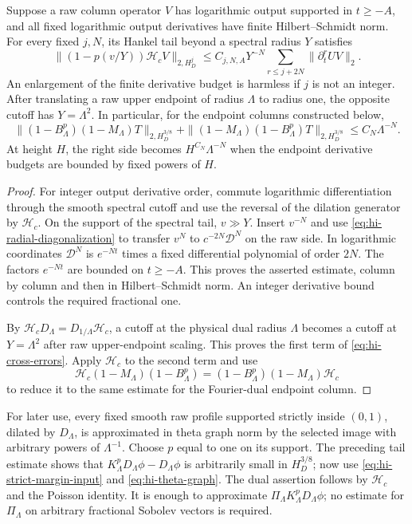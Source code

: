 \begin{lemma}\label{lem:hi-hankel-cross}
Suppose a raw column operator $V$ has logarithmic output supported in
$t\ge-A$, and all fixed logarithmic output derivatives have finite
Hilbert--Schmidt norm. For every fixed $j,N$, its Hankel tail beyond a
spectral radius $Y$ satisfies
\[
 \|(1-p(v/Y))\mathcal H_cV\|_{2,H_D^j}
 \le C_{j,N,A}Y^{-N}
       \sum_{r\le j+2N}\|\partial_t^rUV\|_2.
\]
An enlargement of the finite derivative budget is harmless if $j$ is
not an integer. After translating a raw upper endpoint of radius
$\Lambda$ to radius one, the opposite cutoff has $Y=\Lambda^2$.
In particular, for the endpoint columns constructed below,
\begin{equation}\label{eq:hi-cross-errors}
 \|(1-B_\Lambda^p)(1-M_\Lambda)T\|_{2,H_D^{3/8}}
 +\|(1-M_\Lambda)(1-B_\Lambda^p)T\|_{2,H_D^{3/8}}
                         \le C_N\Lambda^{-N}.
\end{equation}
At height $H$, the right side becomes $H^{C_N}\Lambda^{-N}$ when
the endpoint derivative budgets are bounded by fixed powers of $H$.
\end{lemma}
\begin{proof}
For integer output derivative order, commute logarithmic differentiation
through the smooth spectral cutoff and use the reversal of the dilation
generator by $\mathcal H_c$. On the support of the spectral tail,
$v\gg Y$. Insert $v^{-N}$ and use
\eqref{eq:hi-radial-diagonalization} to transfer $v^N$ to
$c^{-2N}\mathcal D^N$ on the raw side. In logarithmic coordinates
$\mathcal D^N$ is $e^{-Nt}$ times a fixed differential polynomial of
order $2N$. The factors $e^{-Nt}$ are bounded on $t\ge-A$.
This proves the asserted estimate, column by column and then in
Hilbert--Schmidt norm. An integer derivative bound controls the required
fractional one.

By $\mathcal H_cD_\Lambda=D_{1/\Lambda}\mathcal H_c$, a cutoff at
the physical dual radius $\Lambda$ becomes a cutoff at
$Y=\Lambda^2$ after raw upper-endpoint scaling. This proves the first
term of \eqref{eq:hi-cross-errors}. Apply $\mathcal H_c$ to the second
term and use
\[
 \mathcal H_c(1-M_\Lambda)(1-B_\Lambda^p)
       =(1-B_\Lambda^p)(1-M_\Lambda)\mathcal H_c
\]
to reduce it to the same estimate for the Fourier-dual endpoint column.
\end{proof}

For later use, every fixed smooth raw profile supported strictly inside
$(0,1)$, dilated by $D_\Lambda$, is approximated in theta graph norm
by the selected image with arbitrary powers of $\Lambda^{-1}$.
Choose $p$ equal to one on its support. The preceding tail estimate
shows that $K_\Lambda^pD_\Lambda\phi-D_\Lambda\phi$ is arbitrarily
small in $H_D^{3/8}$; now use \eqref{eq:hi-strict-margin-input} and
\eqref{eq:hi-theta-graph}. The dual assertion follows by
$\mathcal H_c$ and the Poisson identity. It is enough to approximate
$\Pi_\Lambda K_\Lambda^pD_\Lambda\phi$; no estimate for
$\Pi_\Lambda$ on arbitrary fractional Sobolev vectors is required.

